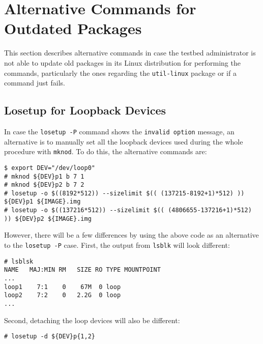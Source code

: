 

% 

\section{Alternative Commands for Outdated Packages}
This section describes alternative commands in case the testbed administrator
is not able to update old packages in its Linux distribution for performing
the commands, particularly the ones regarding the \texttt{util-linux} package
or if a command just fails.

\subsection{Losetup for Loopback Devices}
\label{sec:alternative_losetup}

In case the \texttt{losetup -P} command shows the \texttt{invalid option}
message, an alternative is to manually set all the loopback devices
used during the whole procedure with \texttt{mknod}. To do this, the
alternative commands are:

\begin{lstlisting}[]
$ export DEV="/dev/loop0"
# mknod ${DEV}p1 b 7 1
# mknod ${DEV}p2 b 7 2
# losetup -o $((8192*512)) --sizelimit $(( (137215-8192+1)*512) )) ${DEV}p1 ${IMAGE}.img
# losetup -o $((137216*512)) --sizelimit $(( (4806655-137216+1)*512) )) ${DEV}p2 ${IMAGE}.img
\end{lstlisting}
\FloatBarrier
\vspace{-5mm}

However, there will be a few differences by using the above code as an
alternative to the \texttt{losetup -P} case. First, the output from
\texttt{lsblk} will look different:

\begin{lstlisting}[]
# lsblsk
NAME   MAJ:MIN RM   SIZE RO TYPE MOUNTPOINT
...
loop1    7:1    0    67M  0 loop
loop2    7:2    0   2.2G  0 loop
...
\end{lstlisting}
\FloatBarrier
\vspace{-5mm}

Second, detaching the loop devices will also be different:

\begin{lstlisting}[]
# losetup -d ${DEV}p{1,2}
\end{lstlisting}
\FloatBarrier
\vspace{-5mm}

